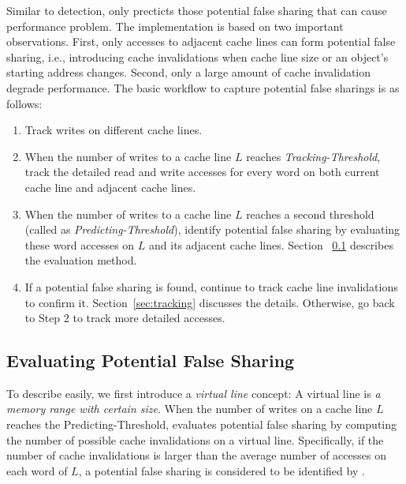 Similar to detection, 
 only precticts those potential false sharing that can 
cause performance problem.
The implementation is based on
two important observations. First, only accesses to 
adjacent cache lines can form potential false sharing, 
i.e., introducing cache invalidations when cache line size
or an object's starting address changes.
Second, only a large amount of cache invalidation degrade performance.
The basic workflow
to capture potential false sharings is as follows:

\begin{enumerate}
\item
Track writes on different cache lines. 

\item
When the number of writes to a cache line $L$ reaches {\it Tracking-Threshold},
track the detailed read and write accesses for every word on both current cache line 
and adjacent cache lines. 

\item
When the number of writes to a cache line $L$ reaches a second threshold (called as
{\it Predicting-Threshold}), 
identify potential false sharing by evaluating these word accesses on $L$ and 
its adjacent cache lines. Section ~\ref{sec:evaluation} describes the evaluation method.

\item
If a potential false sharing is found, continue to track cache line invalidations
to confirm it. Section~\ref{sec:tracking} discusses the details.
Otherwise, go back to Step 2 to track more detailed accesses.
 
\end{enumerate}

\subsection{Evaluating Potential False Sharing}
\label{sec:evaluation}
To describe easily, we first introduce a {\it virtual line} concept:
A virtual line is {\it a memory range with certain size}.
When the number of writes on a cache line $L$ reaches the Predicting-Threshold,
 evaluates potential false sharing by computing the number of possible cache 
invalidations on a virtual line. Specifically, if the number of cache
invalidations is larger than the average number of accesses
on each word of $L$, a potential false sharing is considered to
be identified by .

